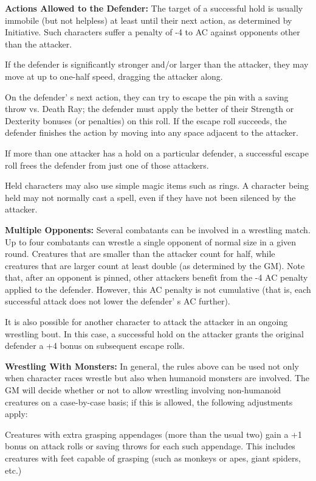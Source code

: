 \documentclass[a4paper,twoside,openany,10pt]{book}
\begin{document}
\begin{multicols}{2}
\textbf{Actions Allowed to the Defender: }The target of a successful hold is usually immobile (but not helpless) at least until their next action, as determined by Initiative. Such characters suffer a penalty of -4 to AC against opponents other than the attacker.

If the defender is significantly stronger and/or larger than the attacker, they may move at up to one-half speed, dragging the attacker along.

On the defender' s next action, they can try to escape the pin with a saving throw vs. Death Ray; the defender must apply the better of their Strength or Dexterity bonuses (or penalties) on this roll. If the escape roll succeeds, the defender finishes the action by moving into any space adjacent to the attacker.

If more than one attacker has a hold on a particular defender, a successful escape roll frees the defender from just one of those attackers.

Held characters may also use simple magic items such as rings. A character being held may not normally cast a spell, even if they have not been silenced by the attacker.

\textbf{Multiple Opponents: }Several combatants can be involved in a wrestling match. Up to four combatants can wrestle a single opponent of normal size in a given round. Creatures that are smaller than the attacker count for half, while creatures that are larger count at least double (as determined by the GM). Note that, after an opponent is pinned, other attackers benefit from the -4 AC penalty applied to the defender. However, this AC penalty is not cumulative (that is, each successful attack does not lower the defender' s AC
further).

It is also possible for another character to attack the attacker in an ongoing wrestling bout. In this case, a successful hold on the attacker grants the original defender a +4 bonus on subsequent escape rolls. 

\textbf{Wrestling With Monsters: }In general, the rules above can be used not only when character races wrestle but also when humanoid monsters are involved. The GM will decide whether or not to allow wrestling involving non-humanoid creatures on a case-by-case basis; if this is allowed, the following adjustments apply:

Creatures with extra grasping appendages (more than the usual two) gain a +1 bonus on attack rolls or saving throws for each such appendage. This includes creatures with feet capable of grasping (such as monkeys or apes, giant spiders, etc.)


\end{multicols}
\end{document}
